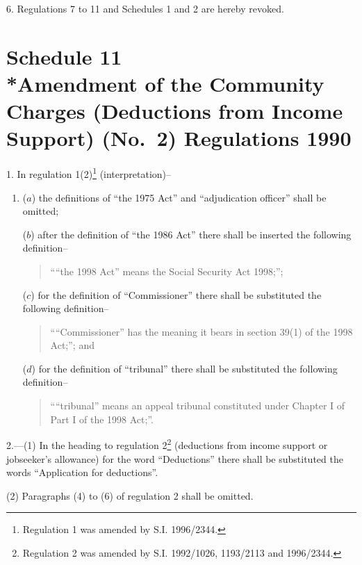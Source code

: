 \documentclass[12pt,a4paper]{article}
\begin{document}
\medskip

6.  Regulations 7 to 11 and Schedules 1 and 2 are hereby revoked.

\part[Schedule 11 --- Amendment of the Community Charges (Deductions from Income Support) (No.\ 2) Regulations 1990]{Schedule 11\\*Amendment of the Community Charges (Deductions from Income Support) (No.\ 2) Regulations 1990}

\renewcommand\parthead{--- Schedule 11}

1.  In regulation 1(2)\footnote{\frenchspacing Regulation 1 was amended by S.I. 1996/2344.} (interpretation)–
\begin{enumerate}\item[]
($a$) the definitions of “the 1975 Act” and “adjudication officer” shall be omitted;

($b$) after the definition of “the 1986 Act” there shall be inserted the following definition–
\begin{quotation}
““the 1998 Act” means the Social Security Act 1998;”;
\end{quotation}

($c$) for the definition of “Commissioner” there shall be substituted the following definition–
\begin{quotation}
    ““Commissioner” has the meaning it bears in section 39(1) of the 1998 Act;”; and 
\end{quotation}

($d$) for the definition of “tribunal” there shall be substituted the following definition–
\begin{quotation}
““tribunal” means an appeal tribunal constituted under Chapter I of Part I of the 1998 Act;”.
\end{quotation}
\end{enumerate}

\medskip

2.---(1)  In the heading to regulation 2\footnote{\frenchspacing Regulation 2 was amended by S.I. 1992/1026, 1193/2113 and 1996/2344.} (deductions from income support or jobseeker’s allowance) for the word “Deductions” there shall be substituted the words “Application for deductions”.

(2) Paragraphs (4) to (6) of regulation 2 shall be omitted.

\medskip
\end{document}
